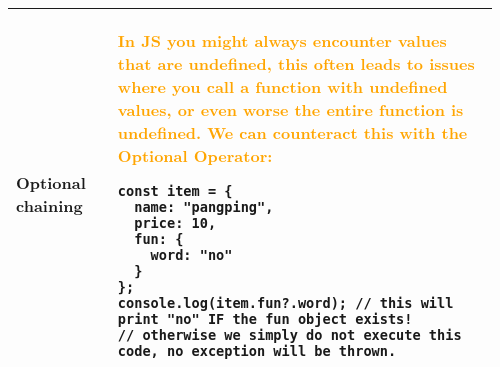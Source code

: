\documentclass[main.tex,fontsize=8pt,paper=a4,paper=portrait,DIV=calc,]{scrartcl}
\begin{document}
\begin{table}[ht!]
\begin{tabular}{|m{0.2\linewidth}|m{0.755\linewidth}|}
\hline
Optional chaining & 
\textcolor{orange}{In JS you might always encounter values that are undefined, this often leads to issues where you call a function with undefined values, or even worse the entire function is undefined.\newline
We can counteract this with the Optional Operator:}\newline
\begin{lstlisting}
const item = {
  name: "pangping",
  price: 10, 
  fun: {
    word: "no"
  }
};
console.log(item.fun?.word); // this will print "no" IF the fun object exists!
// otherwise we simply do not execute this code, no exception will be thrown.
\end{lstlisting}\\
\hline
\end{tabular}

\end{table}
\end{document}
